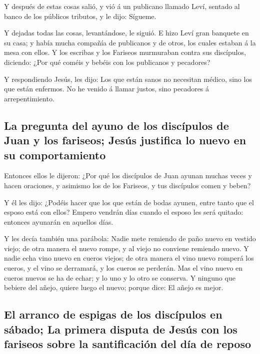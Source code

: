  Y después de estas cosas salió, y vió á un publicano
llamado Leví, sentado al banco de los públicos tributos, y le dijo:
Sígueme.

 Y dejadas todas las cosas, levantándose, le siguió.
 E hizo Leví gran banquete en su casa; y había mucha
compañía de publicanos y de otros, los cuales estaban á la mesa con
ellos.  Y los escribas y los Fariseos murmuraban contra
sus discípulos, diciendo: ¿Por qué coméis y bebéis con los publicanos y
pecadores?

 Y respondiendo Jesús, les dijo: Los que están sanos no
necesitan médico, sino los que están enfermos.  No he
venido á llamar justos, sino pecadores á arrepentimiento.

\hypertarget{la-pregunta-del-ayuno-de-los-discuxedpulos-de-juan-y-los-fariseos-jesuxfas-justifica-lo-nuevo-en-su-comportamiento}{%
\subsection{La pregunta del ayuno de los discípulos de Juan y los
fariseos; Jesús justifica lo nuevo en su
comportamiento}\label{la-pregunta-del-ayuno-de-los-discuxedpulos-de-juan-y-los-fariseos-jesuxfas-justifica-lo-nuevo-en-su-comportamiento}}

 Entonces ellos le dijeron: ¿Por qué los discípulos de
Juan ayunan muchas veces y hacen oraciones, y asimismo los de los
Fariseos, y tus discípulos comen y beben?

 Y él les dijo: ¿Podéis hacer que los que están de bodas
ayunen, entre tanto que el esposo está con ellos?  Empero
vendrán días cuando el esposo les será quitado: entonces ayunarán en
aquellos días.

 Y les decía también una parábola: Nadie mete remiendo de
paño nuevo en vestido viejo; de otra manera el nuevo rompe, y al viejo
no conviene remiendo nuevo.  Y nadie echa vino nuevo en
cueros viejos; de otra manera el vino nuevo romperá los cueros, y el
vino se derramará, y los cueros se perderán.  Mas el vino
nuevo en cueros nuevos se ha de echar; y lo uno y lo otro se conserva.
 Y ninguno que bebiere del añejo, quiere luego el nuevo;
porque dice: El añejo es mejor.

\hypertarget{el-arranco-de-espigas-de-los-discuxedpulos-en-suxe1bado-la-primera-disputa-de-jesuxfas-con-los-fariseos-sobre-la-santificaciuxf3n-del-duxeda-de-reposo}{%
\subsection{El arranco de espigas de los discípulos en sábado; La
primera disputa de Jesús con los fariseos sobre la santificación del día
de
reposo}\label{el-arranco-de-espigas-de-los-discuxedpulos-en-suxe1bado-la-primera-disputa-de-jesuxfas-con-los-fariseos-sobre-la-santificaciuxf3n-del-duxeda-de-reposo}}

